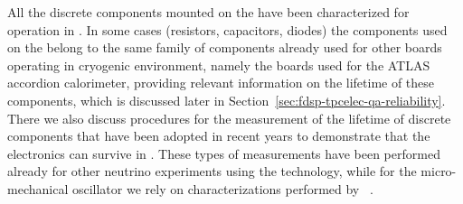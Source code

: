 All the discrete components mounted on the  have been
characterized for operation in . In some cases (resistors,
capacitors, diodes) the components used on the  
belong to the same family of components already used for other boards
operating in cryogenic environment, namely the boards used for the 
ATLAS accordion  calorimeter, providing relevant information
on the lifetime of these components, which is discussed later in 
Section~\ref{sec:fdsp-tpcelec-qa-reliability}. There we also discuss
procedures for the measurement of the lifetime of discrete
components that have been adopted in recent years to demonstrate
that the  electronics can survive in . 
These types of measurements have been performed already for 
other neutrino experiments using the  
technology, while for the micro-mechanical oscillator we 
rely on characterizations performed by ~\cite{nasa_mems}.

